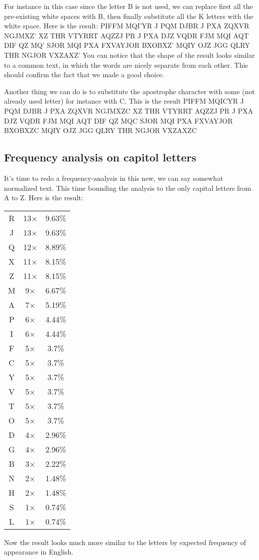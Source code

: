 \documentclass{article}
\begin{document}
For instance  in this case since the letter B is not used, we can replace first all the pre-existing white spaces with B, then finally substitute all the K letters with the white space. Here is the result:
\bigbreak
PIFFM MQI'YR J PQM DJBR J PXA ZQXVR NGJMXZ' XZ THR VTYRRT AQZZJ PR J PXA DJZ VQDR FJM MQI AQT DIF QZ MQ' SJOR MQI PXA FXVAYJOR BXOBXZ' MQIY OJZ JGG QLRY THR NGJOR VXZAXZ'
\bigbreak
You can notice that the shape of the result looks similar to a common text, in which the words are nicely separate from each other. This should confirm the fact that we made a good choice.

Another thing we can do is to substitute the apostrophe character with some (not already used letter) for instance with C. This is the result
\bigbreak
PIFFM MQICYR J PQM DJBR J PXA ZQXVR NGJMXZC XZ THR VTYRRT AQZZJ PR J PXA DJZ VQDR FJM MQI AQT DIF QZ MQC SJOR MQI PXA FXVAYJOR BXOBXZC MQIY OJZ JGG QLRY THR NGJOR VXZAXZC
\bigbreak
\subsection{Frequency analysis on capitol letters}

It's time to redo a frequency-analysis in this new, we can say somewhat normalized text.
This time bounding the analysis to the only capital letters from A to Z.
Here is the result:
\bigbreak
\begin{tabular}{ c c c }
R & 13× & 9.63\% \\
J & 13× & 9.63\% \\
Q & 12× & 8.89\% \\
X & 11× & 8.15\% \\
Z & 11× & 8.15\% \\
M & 9× & 6.67\% \\
A & 7× & 5.19\% \\
P & 6× & 4.44\% \\
I & 6× & 4.44\% \\
F & 5× & 3.7\% \\
C & 5× & 3.7\% \\
Y & 5× & 3.7\% \\
V & 5× & 3.7\% \\
T & 5× & 3.7\% \\
O & 5× & 3.7\% \\
D & 4× & 2.96\% \\
G & 4× & 2.96\% \\
B & 3× & 2.22\% \\
N & 2× & 1.48\% \\
H & 2× & 1.48\% \\
S & 1× & 0.74\% \\
L & 1× & 0.74\% \\
\end{tabular}
\bigbreak
Now the result looks much more similar to the letters by expected frequency of appearance in English.
\end{document}

